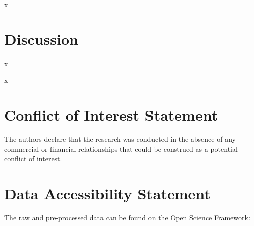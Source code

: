 x



\section{Discussion}
\label{discussion}
x


\begin{acknowledgements}
 x
\end{acknowledgements}


\section*{Conflict of Interest Statement}

The authors declare that the research was conducted in the absence of any commercial or financial relationships that could be construed as a potential conflict of interest.

\section*{Data Accessibility Statement}
The raw and pre-processed data can be found on the Open Science Framework:  






